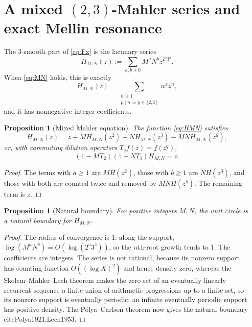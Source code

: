 \documentclass[11pt]{article}
\numberwithin{equation}{section}
\newtheorem{proposition}[theorem]{Proposition}
\theoremstyle{definition}
\theoremstyle{remark}
\begin{document}
\section{A mixed $(2,3)$-Mahler series and exact Mellin resonance}
\label{sec:mahler-barnes}

The $3$-smooth part of \eqref{eq:Fx} is the lacunary series
\begin{equation}
 H_{M,N}(z):=\sum_{a,b\ge0}M^aN^b z^{2^a3^b}.
 \label{eq:HMN}
\end{equation}
When \eqref{eq:MN} holds, this is exactly
\[
 H_{M,N}(z)=\sum_{\substack{n\ge1\\p\mid n\Rightarrow p\in\{2,3\}}}n^xz^n,
\]
and it has nonnegative integer coefficients.

\begin{proposition}[Mixed Mahler equation]
\label{prop:mixed-mahler}
The function \eqref{eq:HMN} satisfies
\begin{equation}
 H_{M,N}(z)=z+M H_{M,N}(z^2)+N H_{M,N}(z^3)-MN H_{M,N}(z^6),
 \label{eq:mixed-mahler}
\end{equation}
or, with commuting dilation operators $T_qf(z)=f(z^q)$,
\begin{equation}
 (1-MT_2)(1-NT_3)H_{M,N}=z.
 \label{eq:factored-mahler}
\end{equation}
\end{proposition}

\begin{proof}
The terms with $a\ge1$ are $MH(z^2)$, those with $b\ge1$ are $NH(z^3)$, and those with both are counted twice and removed by $MNH(z^6)$.  The remaining term is $z$.
\end{proof}

\begin{proposition}[Natural boundary]
\label{prop:natural-boundary}
For positive integers $M,N$, the unit circle is a natural boundary for $H_{M,N}$.
\end{proposition}

\begin{proof}
The radius of convergence is $1$: along the support, $\log(M^aN^b)=O(\log(2^a3^b))$, so the $n$th-root growth tends to $1$.  The coefficients are integers.  The series is not rational, because its nonzero support has counting function $O((\log X)^2)$ and hence density zero, whereas the Skolem--Mahler--Lech theorem makes the zero set of an eventually linearly recurrent sequence a finite union of arithmetic progressions up to a finite set, so its nonzero support is eventually periodic; an infinite eventually periodic support has positive density.  The P\'olya--Carlson theorem now gives the natural boundary \\cite{Polya1921,Lech1953}.
\end{proof}
\end{document}
